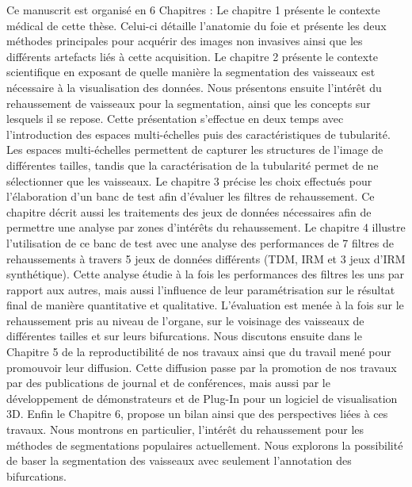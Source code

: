 Ce manuscrit est organisé en 6 Chapitres : Le chapitre 1 présente le contexte médical de cette thèse. Celui-ci détaille l'anatomie du foie et présente les deux méthodes principales pour acquérir des images non invasives ainsi que les différents artefacts liés à cette acquisition. Le chapitre 2 présente le contexte scientifique en exposant de quelle manière la segmentation des vaisseaux est nécessaire à la visualisation des données. Nous présentons ensuite l'intérêt du rehaussement de vaisseaux pour la segmentation, ainsi que les concepts sur lesquels il se repose. Cette présentation s'effectue en deux temps avec l'introduction des espaces multi-échelles puis des caractéristiques de tubularité. Les espaces multi-échelles permettent de capturer les structures de l'image de différentes tailles, tandis que la caractérisation de la tubularité permet de ne sélectionner que les vaisseaux. Le chapitre 3 précise les choix effectués pour l'élaboration d'un banc de test afin d'évaluer les filtres de rehaussement. Ce chapitre décrit aussi les traitements des jeux de données nécessaires afin de permettre une analyse par zones d'intérêts du rehaussement. Le chapitre 4 illustre l'utilisation de ce banc de test avec une analyse des performances de 7 filtres de rehaussements à travers 5 jeux de données différents (TDM, IRM et 3 jeux d'IRM synthétique). Cette analyse étudie à la fois les performances des filtres les uns par rapport aux autres, mais aussi l'influence de leur paramétrisation sur le résultat final de manière quantitative et qualitative. L'évaluation est menée à la fois sur le rehaussement pris au niveau de l'organe, sur le voisinage des vaisseaux de différentes tailles et sur leurs bifurcations. Nous discutons ensuite dans le Chapitre 5 de la reproductibilité de nos travaux ainsi que du travail mené pour promouvoir leur diffusion. Cette diffusion passe par la promotion de nos travaux par des publications de journal et de conférences, mais aussi par le développement de démonstrateurs et de Plug-In pour un logiciel de visualisation 3D. Enfin le Chapitre 6, propose un bilan ainsi que des perspectives liées à ces travaux. Nous montrons en particulier, l'intérêt du rehaussement pour les méthodes de segmentations populaires actuellement. Nous explorons la possibilité de baser la segmentation des vaisseaux avec seulement l'annotation des bifurcations. 